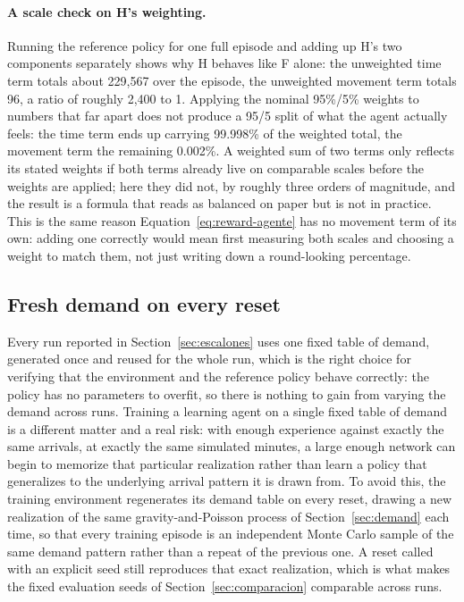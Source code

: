 \documentclass[11pt,a4paper]{article}
\begin{document}
\paragraph{A scale check on H's weighting.} Running the reference policy for one full episode and adding up H's two components separately shows why H behaves like F alone: the unweighted time term totals about 229{,}567 over the episode, the unweighted movement term totals 96, a ratio of roughly 2{,}400 to 1. Applying the nominal 95\%/5\% weights to numbers that far apart does not produce a 95/5 split of what the agent actually feels: the time term ends up carrying 99.998\% of the weighted total, the movement term the remaining 0.002\%. A weighted sum of two terms only reflects its stated weights if both terms already live on comparable scales before the weights are applied; here they did not, by roughly three orders of magnitude, and the result is a formula that reads as balanced on paper but is not in practice. This is the same reason Equation~\ref{eq:reward-agente} has no movement term of its own: adding one correctly would mean first measuring both scales and choosing a weight to match them, not just writing down a round-looking percentage.

\subsection{Fresh demand on every reset}
\label{sec:demanda-fresca}

Every run reported in Section~\ref{sec:escalones} uses one fixed table of demand, generated once and reused for the whole run, which is the right choice for verifying that the environment and the reference policy behave correctly: the policy has no parameters to overfit, so there is nothing to gain from varying the demand across runs. Training a learning agent on a single fixed table of demand is a different matter and a real risk: with enough experience against exactly the same arrivals, at exactly the same simulated minutes, a large enough network can begin to memorize that particular realization rather than learn a policy that generalizes to the underlying arrival pattern it is drawn from. To avoid this, the training environment regenerates its demand table on every reset, drawing a new realization of the same gravity-and-Poisson process of Section~\ref{sec:demand} each time, so that every training episode is an independent Monte Carlo sample of the same demand pattern rather than a repeat of the previous one. A reset called with an explicit seed still reproduces that exact realization, which is what makes the fixed evaluation seeds of Section~\ref{sec:comparacion} comparable across runs.
\end{document}
